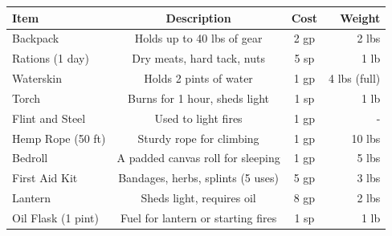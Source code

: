 \begin{center}
\begin{tabular}{lccr}
\hline
\textbf{Item} & \textbf{Description} & \textbf{Cost} & \textbf{Weight} \\ \hline
Backpack & Holds up to 40 lbs of gear & 2 gp & 2 lbs \\
Rations (1 day) & Dry meats, hard tack, nuts & 5 sp & 1 lb \\
Waterskin & Holds 2 pints of water & 1 gp & 4 lbs (full) \\
Torch & Burns for 1 hour, sheds light & 1 sp & 1 lb \\
Flint and Steel & Used to light fires & 1 gp & - \\
Hemp Rope (50 ft) & Sturdy rope for climbing & 1 gp & 10 lbs \\
Bedroll & A padded canvas roll for sleeping & 1 gp & 5 lbs \\
First Aid Kit & Bandages, herbs, splints (5 uses) & 5 gp & 3 lbs \\
Lantern & Sheds light, requires oil & 8 gp & 2 lbs \\
Oil Flask (1 pint) & Fuel for lantern or starting fires & 1 sp & 1 lb \\ \hline
\end{tabular}
\end{center}


